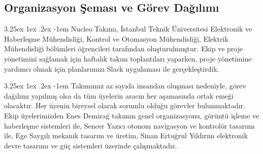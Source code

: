 \documentclass[12pt]{article}
\makeatletter
\renewcommand\paragraph{\@startsection{paragraph}{5}{\z@}%
  {3.25ex \@plus1ex \@minus.2ex}%
  {-1em}%
  {\normalfont\normalsize\bfseries}}
\makeatother
\begin{document}
\begin{table}[h]
\centering
{}
\caption{Takım Üyeleri}
\label{tab:takim-uyeleri}
\end{table}

\subsection{Organizasyon Şeması ve Görev Dağılımı}

\paragraph{} Nucleo Takımı, İstanbul Teknik Üniversitesi Elektronik ve Haberleşme Mühendisliği, Kontrol ve Otomasyon Mühendisliği, Elektrik Mühendisliği bölümleri öğrencileri tarafından oluşturulmuştur. Ekip ve proje yönetimini sağlamak için haftalık takım toplantıları yaparken, proje yönetimine yardımcı olmak için planlarımızı Slack uygulaması ile gerçekleştirdik.

\paragraph{} Takımımız az sayıda insandan oluşması nedeniyle, görev dağılımı yapılmış olsa da tüm üyelerin aracın her aşamasında ortak emeği olacaktır. Her üyenin bireysel olarak sorumlu olduğu görevler bulunmaktadır. Ekip üyelerimizden Enes Demirağ takımın genel organizasyonu, görüntü işleme ve haberleşme sistemleri ile, Sencer Yazıcı otonom navigasyon ve kontrolör tasarımı ile, Ege Saygılı mekanik tasarım ve üretim, Sinan Ertuğrul Yıldırım elektronik devre tasarımı ve güç sistemleri üzerinde çalışmaktadır.

\newpage
\end{document}
